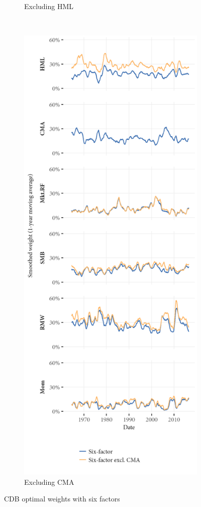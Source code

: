 \begin{figure}[htbp]
\begin{subfigure}{0.45\textwidth}
    \caption{Excluding HML}
  \end{subfigure}
  ~
  \begin{subfigure}{0.45\textwidth}
    \includegraphics[width=\textwidth]{graphics/weights/appendix_Weights_CDB_6F_EXCL_CMA_6F.png}
    \caption{Excluding CMA}
  \end{subfigure}
  \caption{CDB optimal weights with six factors}


\end{figure}
